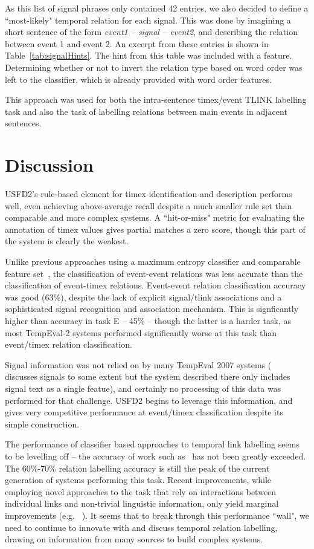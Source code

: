 \documentclass[11pt]{article}
\begin{document}
As this list of signal phrases only contained 42 entries, we also decided to define a ``most-likely" temporal relation for each signal. This was done by imagining a short sentence of the form \emph{event1 -- signal -- event2}, and describing the relation between event 1 and event 2. An excerpt from these entries is shown in Table~\ref{tab:signalHints}. The hint from this table was included with a feature. Determining whether or not to invert the relation type based on word order was left to the classifier, which is already provided with word order features.

This approach was used for both the intra-sentence timex/event TLINK labelling task and also the task of labelling relations between main events in adjacent sentences.

\section{Discussion}
\label{discussion}
USFD2's rule-based element for timex identification and description performs well, even achieving above-average recall despite a much smaller rule set than comparable and more complex systems. A ``hit-or-miss" metric for evaluating the annotation of timex values gives partial matches a zero score, though this part of the system is clearly the weakest.

Unlike previous approaches using a maximum entropy classifier and comparable feature set~\cite{mani2006machine,derczynski2010signals}, the classification of event-event relations was less accurate than the classification of event-timex relations. Event-event relation classification accuracy was good (63\%), despite the lack of explicit signal/tlink associations and a sophisticated signal recognition and association mechanism. This is signficantly higher than accuracy in task E -- 45\% -- though the latter is a harder task, as most TempEval-2 systems performed significantly worse at this task than event/timex relation classification.

Signal information was not relied on by many TempEval 2007 systems (~ discusses signals to some extent but the system described there only includes signal text as a single featue), and certainly no processing of this data was performed for that challenge. USFD2 begins to leverage this information, and gives very competitive performance at event/timex classification despite its simple construction.

The performance of classifier based approaches to temporal link labelling seems to be levelling off -- the accuracy of work such as~ has not been greatly exceeded. The 60\%-70\% relation labelling accuracy is still the peak of the current generation of systems performing this task. Recent improvements, while employing novel approaches to the task that rely on interactions between individual links and non-trivial linguistic information, only yield marginal improvements (e.g. ~). It seems that to break through this performance ``wall", we need to continue to innovate with and discuss temporal relation labelling, drawing on information from many sources to build complex systems.
\end{document}
